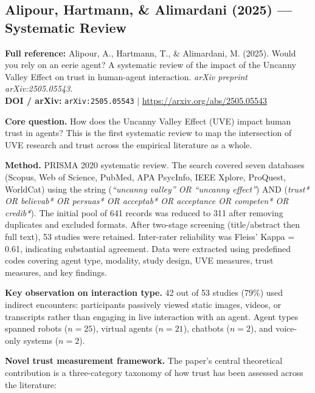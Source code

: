 \documentclass[11pt, a4paper]{article}
\begin{document}
\subsection{Alipour, Hartmann, \& Alimardani (2025) --- Systematic Review}

\begin{infobox}
\small
\textbf{Full reference:} Alipour, A., Hartmann, T., \& Alimardani, M. (2025). Would you rely on an eerie agent? A systematic review of the impact of the Uncanny Valley Effect on trust in human-agent interaction. \textit{arXiv preprint arXiv:2505.05543}.\\[4pt]
\textbf{DOI / arXiv:} \texttt{arXiv:2505.05543} $|$ \url{https://arxiv.org/abs/2505.05543}
\end{infobox}

\textbf{Core question.} How does the Uncanny Valley Effect (UVE) impact human trust in agents? This is the first systematic review to map the intersection of UVE research and trust across the empirical literature as a whole.

\medskip
\textbf{Method.} PRISMA 2020 systematic review. The search covered seven databases (Scopus, Web of Science, PubMed, APA PsycInfo, IEEE Xplore, ProQuest, WorldCat) using the string (\textit{``uncanny valley'' OR ``uncanny effect''}) AND (\textit{trust* OR believab* OR persuas* OR acceptab* OR acceptance OR competen* OR credib*}). The initial pool of 641 records was reduced to 311 after removing duplicates and excluded formats. After two-stage screening (title/abstract then full text), 53 studies were retained. Inter-rater reliability was Fleiss' Kappa = 0.61, indicating substantial agreement. Data were extracted using predefined codes covering agent type, modality, study design, UVE measures, trust measures, and key findings.

\medskip
\textbf{Key observation on interaction type.} 42 out of 53 studies (79\%) used indirect encounters: participants passively viewed static images, videos, or transcripts rather than engaging in live interaction with an agent. Agent types spanned robots ($n=25$), virtual agents ($n=21$), chatbots ($n=2$), and voice-only systems ($n=2$).

\medskip
\textbf{Novel trust measurement framework.} The paper's central theoretical contribution is a three-category taxonomy of how trust has been assessed across the literature:
\end{document}
